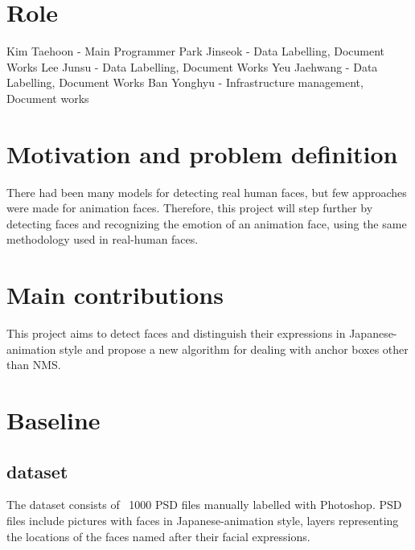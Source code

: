 \documentclass{article}
\begin{document}


%
%

\section{Role}
Kim Taehoon - Main Programmer\newline
Park Jinseok - Data Labelling, Document Works\newline
Lee Junsu - Data Labelling, Document Works\newline
Yeu Jaehwang - Data Labelling, Document Works\newline
Ban Yonghyu - Infrastructure management, Document works\newline


\section{Motivation and problem definition}
There had been many models for detecting real human faces, but few approaches
were made for animation faces. Therefore, this project will step further by
detecting faces and recognizing the emotion of an animation face, using the same
methodology used in real-human faces.

\section{Main contributions}
This project aims to detect faces and distinguish their expressions in
Japanese-animation style and propose a new algorithm for dealing with anchor
boxes other than NMS.

\section{Baseline}
\subsection{dataset}
The dataset consists of ~1000 PSD files manually labelled with Photoshop. PSD
files include pictures with faces in Japanese-animation style, layers
representing the locations of the faces named after their facial expressions.
\end{document}
